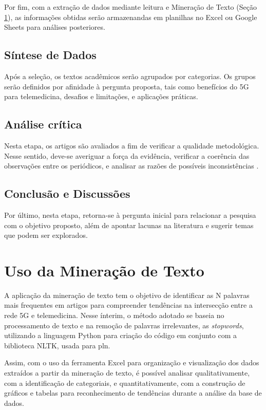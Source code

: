 Por fim, com a extração de dados mediante leitura e Mineração de Texto (Seção \ref{sec:mineracao}), as informações obtidas serão armazenandas em planilhas no Excel ou Google Sheets para análises posteriores.

\subsection{Síntese de Dados}
Após a seleção, os textos acadêmicos serão agrupados por categorias. Os grupos serão definidos por afinidade à pergunta proposta, tais como benefícios do 5G para telemedicina, desafios e limitações, e aplicações práticas.

\subsection{Análise crítica}
Nesta etapa, os artigos são avaliados a fim de verificar a qualidade metodológica. Nesse sentido, deve-se averiguar a força da evidência, verificar a coerência das observações entre os periódicos, e analisar as razões de possíveis inconsistências .

\subsection{Conclusão e Discussões}

Por último, nesta etapa, retorna-se à pergunta inicial para relacionar a pesquisa com o objetivo proposto, além de apontar lacunas na literatura e sugerir temas que podem ser explorados.

\section{Uso da Mineração de Texto}
\label{sec:mineracao}

A aplicação da mineração de texto tem o objetivo de identificar as N palavras mais frequentes em artigos para compreender tendências na intersecção entre a rede 5G e telemedicina. Nesse ínterim, o método adotado se baseia no processamento de texto e na remoção de palavras irrelevantes, as \textit{stopwords}, utilizando a linguagem Python para criação do código em conjunto com a biblioteca NLTK, usada para \gls{pln}.

Assim, com o uso da ferramenta Excel para organização e visualização dos dados extraídos a partir da mineração de texto, é possível analisar qualitativamente, com a identificação de categoriais, e quantitativamente, com a construção de gráficos e tabelas para reconhecimento de tendências durante a análise da base de dados. 



